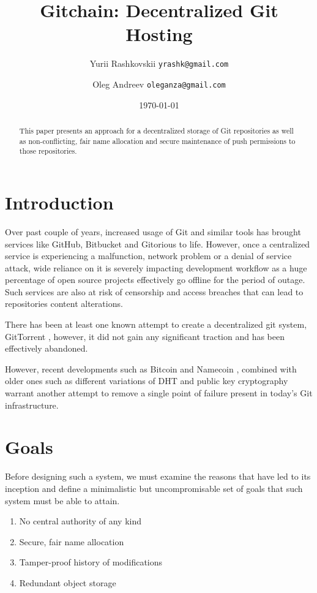 \documentclass[a4paper]{article}
\title{Gitchain: Decentralized Git Hosting}
\author{Yurii Rashkovskii \texttt{yrashk@gmail.com}\and Oleg Andreev \texttt{oleganza@gmail.com}}
\date{\today}
\begin{document}
\maketitle

\begin{abstract}
This paper presents an approach for a decentralized storage of Git repositories as well as non-conflicting, fair name allocation and secure maintenance of push permissions to those repositories.
\end{abstract}

\section{Introduction}

Over past couple of years, increased usage of Git and similar tools has brought services like GitHub, Bitbucket and Gitorious to life. However, once a centralized service is experiencing a malfunction, network problem or a denial of service attack, wide reliance on it is severely impacting development workflow as a huge percentage of open source projects effectively go offline for the period of outage. Such services are also at risk of censorship and access breaches that can lead to repositories content alterations.

There has been at least one known attempt to create a decentralized git system, GitTorrent \cite{fonseca06}, however, it did not gain any significant traction and has been effectively abandoned.

However, recent developments such as Bitcoin \cite{bitcoin} and Namecoin \cite{namecoin}, combined with older ones such as different variations of DHT and public key cryptography warrant another attempt to remove a single point of failure present in today's Git infrastructure.

\section{Goals}

Before designing such a system, we must examine the reasons that have led to its inception and define a minimalistic but
uncompromisable set of goals that such system must be able to attain.

\begin{enumerate}
\item No central authority of any kind
\item Secure, fair name allocation
\item Tamper-proof history of modifications
\item Redundant object storage
\end{enumerate}
\end{document}
